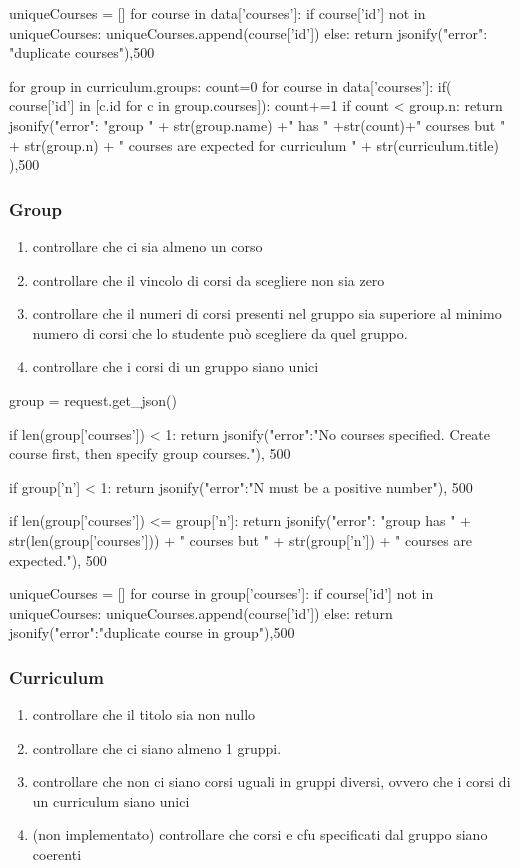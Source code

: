 \documentclass{article}
\begin{document}
\begin{python}
 uniqueCourses = []
        for course in data['courses']:
        	if course['id'] not in uniqueCourses:
        		uniqueCourses.append(course['id'])
        	else:
        		return  jsonify({"error": "duplicate courses"}),500

        for group in curriculum.groups:
        	count=0
        	for course in data['courses']:
        		if( course['id'] in [c.id for c in group.courses]):
        			count+=1
        	if count < group.n:
        		return jsonify({"error": "group " + str(group.name) +" has " +str(count)+" courses but " + str(group.n) + " courses are expected for curriculum " +  str(curriculum.title) }),500
\end{python}

\subsubsection{Group}
\begin{enumerate}
\item controllare che ci sia almeno un corso
\item controllare che il vincolo di corsi da scegliere non sia zero
\item controllare che il numeri di corsi presenti nel gruppo sia superiore al minimo numero di corsi che lo studente può scegliere da quel gruppo.
\item controllare che i corsi di un gruppo siano unici
\end{enumerate}
\begin{python}
group =	request.get_json()

		if len(group['courses']) < 1:
			return jsonify({"error":"No courses specified. Create course first, then specify group courses."}), 500
		
		if group['n'] < 1:
			return jsonify({"error":"N must be a positive number"}), 500

		if len(group['courses']) <= group['n']:
			return jsonify({"error": "group has " + str(len(group['courses'])) + " courses but " + str(group['n']) + " courses are expected."}), 500

		uniqueCourses = []
		for course in group['courses']:
			if course['id'] not in uniqueCourses:
				uniqueCourses.append(course['id'])
			else:
				return jsonify({"error":"duplicate course in group"}),500

\end{python}

\subsubsection{Curriculum}
\begin{enumerate}
\item controllare che il titolo sia non nullo
\item controllare che ci siano almeno 1 gruppi.
\item controllare che non ci siano corsi uguali in gruppi diversi, ovvero che i corsi di un curriculum siano unici
\item (non implementato) controllare che corsi e cfu specificati dal gruppo siano coerenti
\end{enumerate}
\end{document}
